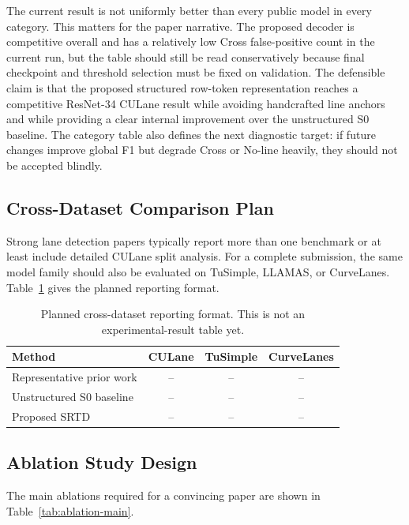 \documentclass[conference]{IEEEtran}
\newcommand{\method}{SRTD}
\begin{document}
The current result is not uniformly better than every public model in every category. This matters for the paper narrative. The proposed decoder is competitive overall and has a relatively low Cross false-positive count in the current run, but the table should still be read conservatively because final checkpoint and threshold selection must be fixed on validation. The defensible claim is that the proposed structured row-token representation reaches a competitive ResNet-34 CULane result while avoiding handcrafted line anchors and while providing a clear internal improvement over the unstructured S0 baseline. The category table also defines the next diagnostic target: if future changes improve global F1 but degrade Cross or No-line heavily, they should not be accepted blindly.

\subsection{Cross-Dataset Comparison Plan}

Strong lane detection papers typically report more than one benchmark or at least include detailed CULane split analysis. For a complete submission, the same model family should also be evaluated on TuSimple, LLAMAS, or CurveLanes. Table~\ref{tab:crossdataset} gives the planned reporting format.

\begin{table}[t]
\centering
\caption{Planned cross-dataset reporting format. This is not an experimental-result table yet.}
\label{tab:crossdataset}
\small
\setlength{\tabcolsep}{3pt}
\begin{tabularx}{\linewidth}{>{\raggedright\arraybackslash}X c c c}
\toprule
Method & CULane & TuSimple & CurveLanes \\
\midrule
Representative prior work & -- & -- & -- \\
Unstructured S0 baseline & -- & -- & -- \\
Proposed \method & -- & -- & -- \\
\bottomrule
\end{tabularx}
\end{table}

\subsection{Ablation Study Design}

The main ablations required for a convincing paper are shown in Table~\ref{tab:ablation-main}.
\end{document}
